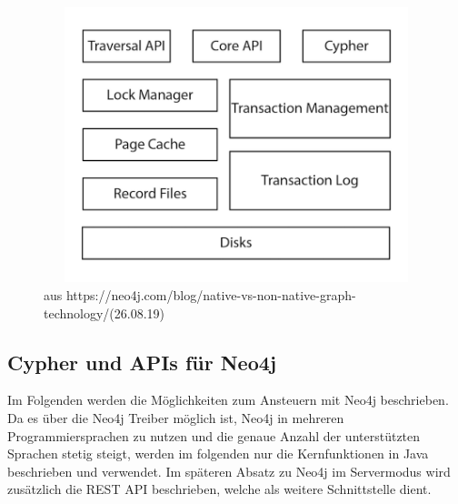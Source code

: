 \begin{figure}[H]
	\centering
	\includegraphics [width=12cm, height=8cm]{Figures/Architecture}
	\caption[Architecture]{ aus https://neo4j.com/blog/native-vs-non-native-graph-technology/(26.08.19)}
	\label{fig:Architecure}
\end{figure}

\subsection{Cypher und APIs für Neo4j}
Im Folgenden werden die Möglichkeiten zum Ansteuern mit Neo4j beschrieben. Da es über die Neo4j Treiber möglich ist, Neo4j in mehreren Programmiersprachen zu nutzen und die genaue Anzahl der unterstützten Sprachen stetig steigt, werden im folgenden nur die Kernfunktionen in Java beschrieben und verwendet. Im späteren Absatz zu Neo4j im Servermodus wird zusätzlich die REST API beschrieben, welche als weitere Schnittstelle dient.

